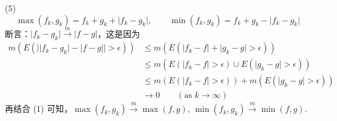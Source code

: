 (5)
\[
\max(f_k,g_k)=f_k+g_k+\lvert f_k-g_k \rvert,\qquad \min(f_k,g_k)=f_k+g_k-\lvert f_k-g_k \rvert
\]
断言：$\lvert f_k-g_k \rvert\overset{ m }{ \to }\lvert f-g \rvert$，这是因为
\[
\begin{aligned}
m(E(\lvert \lvert f_k-g_k \rvert -\lvert f-g \rvert  \rvert >\epsilon)) & \leq m(E(\lvert f_k-f \rvert +\lvert g_k-g \rvert >\epsilon)) \\
 & \leq m(E(\lvert f_k-f \rvert >\epsilon)\cup E(\lvert g_k-g \rvert >\epsilon) ) \\
 & \leq m(E(\lvert f_k-f \rvert >\epsilon))+m(E(\lvert g_k-g \rvert >\epsilon)) \\
 & \to0\qquad (\text{as }k\to \infty)
\end{aligned}
\]
再结合 (1) 可知，$\max(f_k,g_k)\overset{ m }{ \to }\max(f,g)$, $\min(f_k,g_k)\overset{ m }{ \to }\min(f,g)$.
